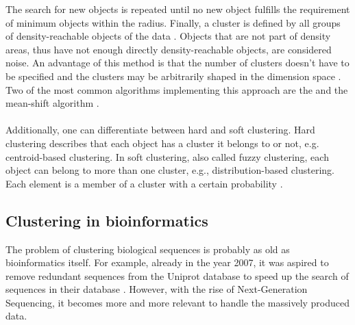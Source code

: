 \documentclass[12pt,a4paper,english]{article}
\begin{document}
	The search for new objects is repeated until no new object fulfills the requirement of minimum objects within the radius.
	Finally, a cluster is defined by all groups of density-reachable objects of the data \citep{density-based:05}.
	Objects that are not part of density areas, thus have not enough directly density-reachable objects, are considered noise.
	An advantage of this method is that the number of clusters doesn't have to be specified and the clusters may be arbitrarily shaped in the dimension space \citep{density-based:11}.
	Two of the most common algorithms implementing this approach are the \dbscan \citep{dbscan:96} and the mean-shift algorithm \citep{mean-shift:95}.\\
	\\
	\noindent
    Additionally, one can differentiate between hard and soft clustering. Hard clustering describes that each object has a cluster it belongs to or not, e.g. centroid-based clustering. In soft clustering, also called fuzzy clustering, each object can belong to more than one cluster, e.g., distribution-based clustering. Each element is a member of a cluster with a certain probability \citep{hard-vs-soft:14}.


	\subsection{Clustering in bioinformatics}
	The problem of clustering biological sequences is probably as old as bioinformatics itself. For example, already in the year 2007, it was aspired to remove redundant sequences from the Uniprot database to speed up the search of sequences in their database \citep{uniref:07}. However, with the rise of Next-Generation Sequencing, it becomes more and more relevant to handle the massively produced data.
	
\end{document}
